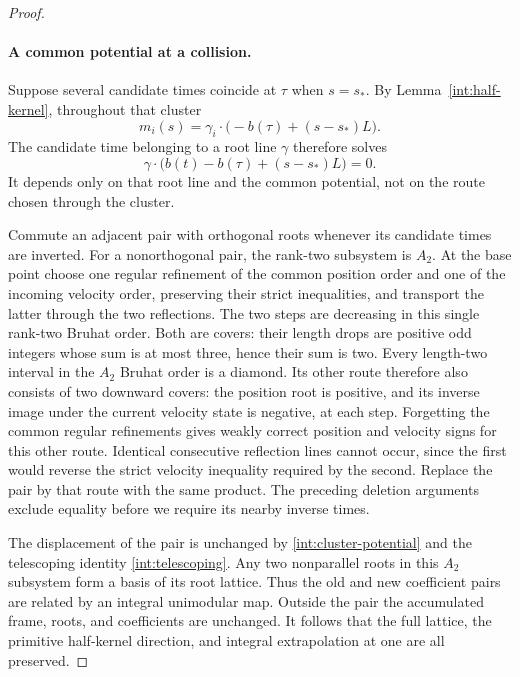 \begin{proof}
\paragraph{A common potential at a collision.}
Suppose several candidate times coincide at \(\tau\) when \(s=s_*\).
By Lemma~\ref{int:half-kernel}, throughout that cluster
\begin{equation}\label{int:cluster-potential}
 m_i(s)=\gamma_i\cdot\bigl(-b(\tau)+(s-s_*)L\bigr).
\end{equation}
The candidate time belonging to a root line \(\gamma\) therefore solves
\begin{equation}\label{int:candidate-time}
 \gamma\cdot\bigl(b(t)-b(\tau)+(s-s_*)L\bigr)=0.
\end{equation}
It depends only on that root line and the common potential, not on the
route chosen through the cluster.

Commute an adjacent pair with orthogonal roots whenever its candidate
times are inverted.  For a nonorthogonal pair, the rank-two subsystem
is \(A_2\).  At the base point choose one regular refinement of the
common position order and one of the incoming velocity order,
preserving their strict inequalities, and transport the latter
through the two reflections.  The two steps are decreasing in this
single rank-two Bruhat order.  Both are covers: their length drops
are positive odd integers whose sum is at most three, hence their
sum is two.  Every length-two interval in the \(A_2\) Bruhat order is
a diamond.  Its other route therefore also consists of two downward
covers: the position root is positive, and its inverse image under
the current velocity state is negative, at each step.  Forgetting
the common regular refinements gives weakly correct position and
velocity signs for this other route.
Identical consecutive reflection lines cannot occur, since the first
would reverse the strict velocity inequality required by the second.
Replace the pair by that route with the same product.  The preceding
deletion arguments exclude equality before we require its nearby
inverse times.

The displacement of the pair is unchanged by
\eqref{int:cluster-potential} and the telescoping identity
\eqref{int:telescoping}.  Any two nonparallel roots in this \(A_2\)
subsystem form a basis of its root lattice.  Thus the old and new
coefficient pairs are related by an integral unimodular map.  Outside
the pair the accumulated frame, roots, and coefficients are unchanged.
It follows that the full lattice, the primitive half-kernel direction,
and integral extrapolation at one are all preserved.


\end{proof}
